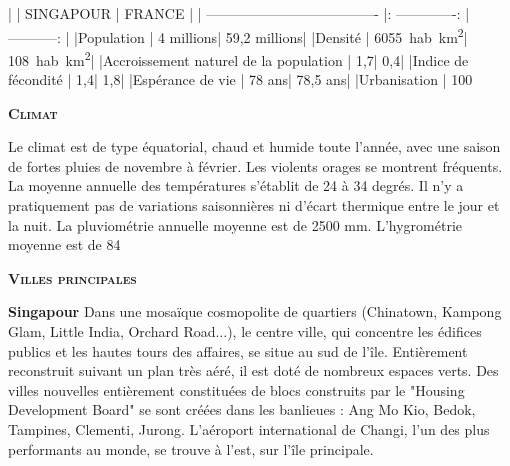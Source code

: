 \begin{multicols}{2}
|                                       |     SINGAPOUR   |    FRANCE    |
| ------------------------------------- |: -------------: | -----------: |
|Population                             |       4 millions| 59,2 millions|
|Densité                                |     \SI{6055}{hab.km^2}|   \SI{108}{hab.km^2}|
|Accroissement naturel de la population |              1,7|           0,4|
|Indice de fécondité                    |              1,4|           1,8|
|Espérance de vie                       |           78 ans|      78,5 ans|
|Urbanisation                           |            100 %

\textbf{\textsc{Climat}}

Le climat est de type équatorial, chaud et humide toute l'année, avec une saison de fortes pluies de novembre à février. Les violents orages se montrent fréquents. La moyenne annuelle des températures s'établit de 24 à 34 degrés. Il n'y a pratiquement pas de variations saisonnières ni d'écart thermique entre le jour et la nuit. La pluviométrie annuelle moyenne est de 2500 mm. L'hygrométrie moyenne est de 84%

\textbf{\textsc{Villes principales}}

\textbf{Singapour}
Dans une mosaïque cosmopolite de quartiers (Chinatown, Kampong Glam, Little India, Orchard Road...), le centre ville, qui concentre les édifices publics et les hautes tours des affaires, se situe au sud de l'île. Entièrement reconstruit suivant un plan très aéré, il est doté de nombreux espaces verts. Des villes nouvelles entièrement constituées de blocs construits par le "Housing Development Board" se sont créées dans les banlieues : Ang Mo Kio, Bedok, Tampines, Clementi, Jurong. L'aéroport international de Changi, l'un des plus performants au monde, se trouve à l'est, sur l'île principale.

\end{multicols}

